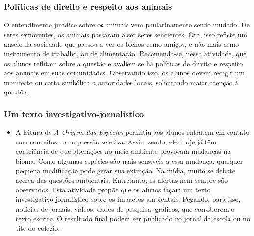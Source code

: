 \documentclass[11pt]{extarticle}
\begin{document}
\subsubsection{Políticas de direito e respeito aos animais}

O entendimento jurídico sobre os animais vem paulatinamente sendo
mudado. De seres semoventes, os animais passaram a ser seres sencientes.
Ora, isso reflete um anseio da sociedade que passou a ver os bichos como
amigos, e não mais como instrumento de trabalho, ou de alimentação.
Recomenda-se, nessa atividade, que os alunos reflitam sobre a questão
e avaliem se há políticas de direito e respeito aos animais em suas
comunidades. Observando isso, os alunos devem redigir um manifesto ou carta
simbólica a autoridades locais, solicitando maior atenção à questão.

\subsubsection{Um texto investigativo-jornalístico}

\begin{itemize} \item A leitura de \emph{A Origem das Espécies} permitiu aos
      alunos entrarem em contato com conceitos como pressão seletiva. Assim
      sendo, eles hoje já têm consciência de que alterações no meio-ambiente
      provocam mudanças no bioma. Como algumas espécies são mais sensíveis
      a essa mudança, qualquer pequena modificação pode gerar sua
      extinção. Na mídia, muito se debate acerca das questões ambientais.
      Entretanto, os alertas nem sempre são observados. Esta atividade propõe
      que os alunos façam um texto investigativo-jornalístico sobre os impactos
      ambientais. Pegando, para isso, notícias de jornais, vídeos, dados de
      pesquisa, gráficos, que corroborem o texto escrito. O resultado final
      poderá ser publicado no jornal da escola ou no site do colégio.
  \end{itemize}

\end{document}
